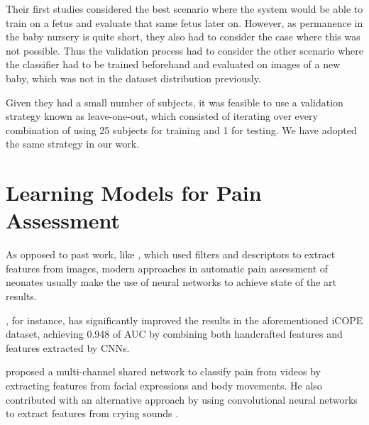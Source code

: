 Their first studies considered the best scenario where the system would be able to train on a fetus and evaluate that same fetus later on. However, as permanence in the baby nursery is quite short, they also had to consider the case where this was not possible. Thus the validation process had to consider the other scenario where the classifier had to be trained beforehand and evaluated on images of a new baby, which was not in the dataset distribution previously.

Given they had a small number of subjects, it was feasible to use a validation strategy known as leave-one-out, which consisted of iterating over every combination of using 25 subjects for training and 1 for testing. We have adopted the same strategy in our work.

\section{Learning Models for Pain Assessment}

As opposed to past work, like \citep{ZhiZGALS18}, which used filters and descriptors to extract features from images, modern approaches in automatic pain assessment of neonates usually make the use of neural networks to achieve state of the art results.

\cite{abs-1807-01631}, for instance, has significantly improved the results in the aforementioned iCOPE dataset, achieving 0.948 of AUC by combining both handcrafted features and features extracted by CNNs.

\cite{SalekinZGKH019} proposed a multi-channel shared network to classify pain from videos by extracting features from facial expressions and body movements. He also contributed with an alternative approach by using convolutional neural networks to extract features from crying sounds \citep{abs-1909-02543}.

